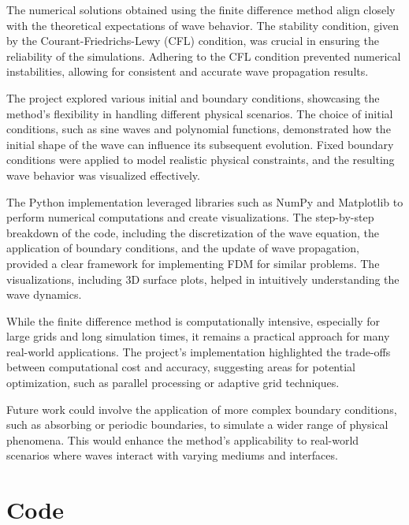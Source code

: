 \documentclass{article}
\begin{document}
The numerical solutions obtained using the finite difference method align
closely with the theoretical expectations of wave behavior. The stability
condition, given by the Courant-Friedrichs-Lewy (CFL) condition, was crucial in
ensuring the reliability of the simulations. Adhering to the CFL condition
prevented numerical instabilities, allowing for consistent and accurate wave
propagation results.

The project explored various initial and boundary conditions, showcasing the
method's flexibility in handling different physical scenarios. The choice of
initial conditions, such as sine waves and polynomial functions, demonstrated
how the initial shape of the wave can influence its subsequent evolution. Fixed
boundary conditions were applied to model realistic physical constraints, and
the resulting wave behavior was visualized effectively.

The Python implementation leveraged libraries such as NumPy and Matplotlib to
perform numerical computations and create visualizations. The step-by-step
breakdown of the code, including the discretization of the wave equation, the
application of boundary conditions, and the update of wave propagation,
provided a clear framework for implementing FDM for similar problems. The
visualizations, including 3D surface plots, helped in intuitively understanding
the wave dynamics.

While the finite difference method is computationally intensive, especially for
large grids and long simulation times, it remains a practical approach for many
real-world applications. The project's implementation highlighted the
trade-offs between computational cost and accuracy, suggesting areas for
potential optimization, such as parallel processing or adaptive grid
techniques.

Future work could involve the application of more complex boundary conditions,
such as absorbing or periodic boundaries, to simulate a wider range of physical
phenomena. This would enhance the method's applicability to real-world
scenarios where waves interact with varying mediums and interfaces.

\newpage
\printbibliography
\newpage

\appendix

\section{Code}


\end{document}
